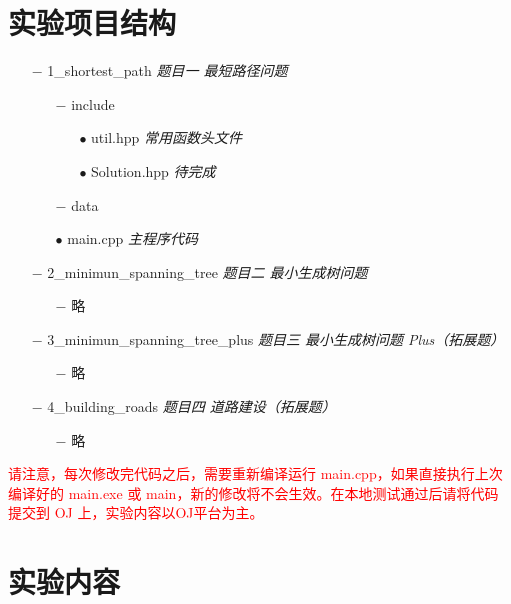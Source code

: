 \documentclass[12pt,a4paper]{article}
\begin{document}
\section{实验项目结构}

\begin{itemize}[noitemsep]
    \item[$-$] 1\_shortest\_path \textit{题目一 \hspace{0.1cm} 最短路径问题}
    \begin{itemize}[noitemsep]
        \item[$-$] include
        \begin{itemize}[noitemsep]
            \item[$\bullet$] util.hpp \textit{常用函数头文件}
            \item[$\bullet$] Solution.hpp \textit{待完成}
        \end{itemize}
        \item[$-$] data
        \item[$\bullet$] main.cpp \textit{主程序代码}
    \end{itemize}
    \item[$-$] 2\_minimun\_spanning\_tree \textit{题目二 \hspace{0.1cm} 最小生成树问题}
    \begin{itemize}[noitemsep]
        \item[$-$] 略
    \end{itemize}
    \item[$-$] 3\_minimun\_spanning\_tree\_plus \textit{题目三 \hspace{0.1cm} 最小生成树问题 Plus（拓展题）}
    \begin{itemize}[noitemsep]
        \item[$-$] 略
    \end{itemize}
    \item[$-$] 4\_building\_roads \textit{题目四 \hspace{0.1cm} 道路建设（拓展题）}
    \begin{itemize}[noitemsep]
        \item[$-$] 略
    \end{itemize}
\end{itemize}

\textcolor{red}{请注意，每次修改完代码之后，需要重新编译运行 main.cpp，如果直接执行上次编译好的 main.exe 或 main，新的修改将不会生效。在本地测试通过后请将代码提交到 OJ 上，实验内容以OJ平台为主。}

\section{实验内容}
\end{document}
